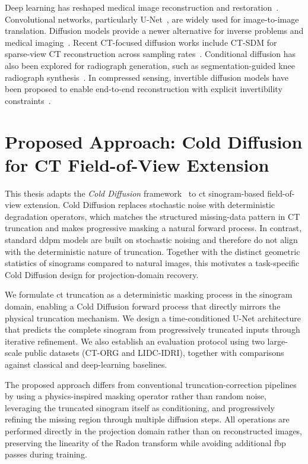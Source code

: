 Deep learning has reshaped medical image reconstruction and restoration~\cite{wang2016deep}. Convolutional networks, particularly U-Net~\cite{ronneberger2015unet}, are widely used for image-to-image translation. Diffusion models provide a newer alternative for inverse problems and medical imaging~\cite{ho2020denoising,song2022solving}. Recent CT-focused diffusion works include CT-SDM for sparse-view CT reconstruction across sampling rates~\cite{yang2025ctsdm}. Conditional diffusion has also been explored for radiograph generation, such as segmentation-guided knee radiograph synthesis~\cite{mei2024segmentation}. In compressed sensing, invertible diffusion models have been proposed to enable end-to-end reconstruction with explicit invertibility constraints~\cite{chen2025idm}.

\section{Proposed Approach: Cold Diffusion for CT Field-of-View Extension}

This thesis adapts the \textit{Cold Diffusion} framework~\cite{bansal2022cold} to \gls{ct} sinogram-based field-of-view extension. Cold Diffusion replaces stochastic noise with deterministic degradation operators, which matches the structured missing-data pattern in CT truncation and makes progressive masking a natural forward process. In contrast, standard \gls{ddpm} models are built on stochastic noising and therefore do not align with the deterministic nature of truncation. Together with the distinct geometric statistics of sinograms compared to natural images, this motivates a task-specific Cold Diffusion design for projection-domain recovery.

We formulate \gls{ct} truncation as a deterministic masking process in the sinogram domain, enabling a Cold Diffusion forward process that directly mirrors the physical truncation mechanism. We design a time-conditioned U-Net architecture that predicts the complete sinogram from progressively truncated inputs through iterative refinement. We also establish an evaluation protocol using two large-scale public datasets (CT-ORG and LIDC-IDRI), together with comparisons against classical and deep-learning baselines.

The proposed approach differs from conventional truncation-correction pipelines by using a physics-inspired masking operator rather than random noise, leveraging the truncated sinogram itself as conditioning, and progressively refining the missing region through multiple diffusion steps. All operations are performed directly in the projection domain rather than on reconstructed images, preserving the linearity of the Radon transform while avoiding additional \gls{fbp} passes during training.

